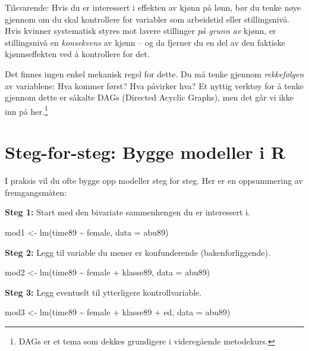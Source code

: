 \documentclass[
  norsk,
  letterpaper,
  DIV=11,
  numbers=noendperiod]{scrreprt}
\newenvironment{Shaded}{\begin{snugshade}}{\end{snugshade}}
\newcommand{\AttributeTok}[1]{\textcolor[rgb]{0.40,0.45,0.13}{#1}}
\newcommand{\FunctionTok}[1]{\textcolor[rgb]{0.28,0.35,0.67}{#1}}
\newcommand{\NormalTok}[1]{\textcolor[rgb]{0.00,0.23,0.31}{#1}}
\newcommand{\OtherTok}[1]{\textcolor[rgb]{0.00,0.23,0.31}{#1}}
\newcommand{\SpecialCharTok}[1]{\textcolor[rgb]{0.37,0.37,0.37}{#1}}
\theoremstyle{definition}
\theoremstyle{remark}
\begin{document}
Tilsvarende: Hvis du er interessert i effekten av kjønn på lønn, bør du
tenke nøye gjennom om du skal kontrollere for variabler som arbeidstid
eller stillingsnivå. Hvis kvinner systematisk styres mot lavere
stillinger \emph{på grunn av} kjønn, er stillingsnivå en
\emph{konsekvens} av kjønn -- og da fjerner du en del av den faktiske
kjønnseffekten ved å kontrollere for det.

Det finnes ingen enkel mekanisk regel for dette. Du må tenke gjennom
\emph{rekkefølgen} av variablene: Hva kommer først? Hva påvirker hva? Et
nyttig verktøy for å tenke gjennom dette er såkalte DAGs (Directed
Acyclic Graphs), men det går vi ikke inn på her.\footnote{DAGs er et
  tema som dekkes grundigere i videregående metodekurs.}

\section{Steg-for-steg: Bygge modeller i
R}\label{steg-for-steg-bygge-modeller-i-r}

I praksis vil du ofte bygge opp modeller steg for steg. Her er en
oppsummering av fremgangsmåten:

\textbf{Steg 1:} Start med den bivariate sammenhengen du er interessert
i.

\begin{Shaded}
\begin{Highlighting}[]
\NormalTok{mod1 }\OtherTok{\textless{}{-}} \FunctionTok{lm}\NormalTok{(time89 }\SpecialCharTok{\textasciitilde{}}\NormalTok{ female, }\AttributeTok{data =}\NormalTok{ abu89)}
\end{Highlighting}
\end{Shaded}

\textbf{Steg 2:} Legg til variable du mener er konfunderende
(bakenforliggende).

\begin{Shaded}
\begin{Highlighting}[]
\NormalTok{mod2 }\OtherTok{\textless{}{-}} \FunctionTok{lm}\NormalTok{(time89 }\SpecialCharTok{\textasciitilde{}}\NormalTok{ female }\SpecialCharTok{+}\NormalTok{ klasse89, }\AttributeTok{data =}\NormalTok{ abu89)}
\end{Highlighting}
\end{Shaded}

\textbf{Steg 3:} Legg eventuelt til ytterligere kontrollvariable.

\begin{Shaded}
\begin{Highlighting}[]
\NormalTok{mod3 }\OtherTok{\textless{}{-}} \FunctionTok{lm}\NormalTok{(time89 }\SpecialCharTok{\textasciitilde{}}\NormalTok{ female }\SpecialCharTok{+}\NormalTok{ klasse89 }\SpecialCharTok{+}\NormalTok{ ed, }\AttributeTok{data =}\NormalTok{ abu89)}
\end{Highlighting}
\end{Shaded}
\end{document}
